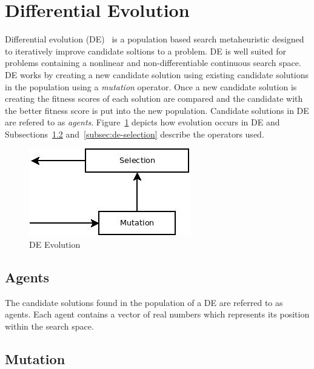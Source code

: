 \section{Differential Evolution}
\label{sec:de}

Differential evolution (DE)~\cite{storn1997differential} is a population based search metaheuristic designed to iteratively improve candidate soltions to a problem. DE is well suited for problems containing a nonlinear and non-differentiable continuous search space. DE works by creating a new candidate solution using existing candidate solutions in the population using a \textit{mutation} operator. Once a new candidate solution is creating the fitness scores of each solution are compared and the candidate with the better fitness score is put into the new population. Candidate solutions in DE are refered to as \textit{agents}. Figure~\ref{fig:deFlowchart} depicts how evolution occurs in DE and Subsections~\ref{subsec:de-mutation} and~\ref{subsec:de-selection} describe the operators used.

\begin{figure}[H]
  \centering
  \includegraphics[bb=0 0 266 144,scale=0.5]{figures/DE.jpeg}
  \caption{DE Evolution}
  \label{fig:deFlowchart}
\end{figure}

\subsection{Agents}

The candidate solutions found in the population of a DE are referred to as agents. Each agent contains a vector of real numbers which represents its position within the search space.

\subsection{Mutation}
\label{subsec:de-mutation}

